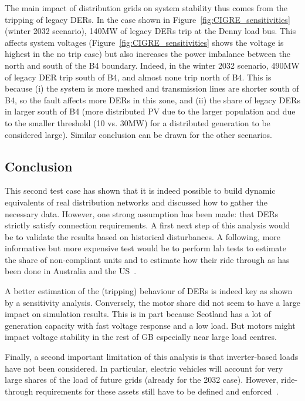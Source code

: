 The main impact of distribution grids on system stability thus comes from the tripping of legacy DERs. In the case shown in Figure~\ref{fig:CIGRE_sensitivities} (winter 2032 scenario), 140MW of legacy DERs trip at the Denny load bus. This affects system voltages (Figure~\ref{fig:CIGRE_sensitivities} shows the voltage is highest in the no trip case) but also increases the power imbalance between the north and south of the B4 boundary. Indeed, in the winter 2032 scenario, 490MW of legacy DER trip south of B4, and almost none trip north of B4. This is because (i) the system is more meshed and transmission lines are shorter south of B4, so the fault affects more DERs in this zone, and (ii) the share of legacy DERs in larger south of B4 (more distributed PV due to the larger population and due to the smaller threshold (10 vs. 30MW) for a distributed generation to be considered large). Similar conclusion can be drawn for the other scenarios.


\subsection{Conclusion}
\label{sec:CIGRE_conclusion}

This second test case has shown that it is indeed possible to build dynamic equivalents of real distribution networks and discussed how to gather the necessary data. However, one strong assumption has been made: that DERs strictly satisfy connection requirements. A first next step of this analysis would be to validate the results based on historical disturbances. A following, more informative but more expensive test would be to perform lab tests to estimate the share of non-compliant units and to estimate how their ride through as has been done in Australia and the US~\cite{aemo_psse_2022, pourbeik_developing_2021}.

A better estimation of the (tripping) behaviour of DERs is indeed key as shown by a sensitivity analysis. Conversely, the motor share did not seem to have a large impact on simulation results. This is in part because Scotland has a lot of generation capacity with fast voltage response and a low load. But motors might impact voltage stability in the rest of GB especially near large load centres.

Finally, a second important limitation of this analysis is that inverter-based loads have not been considered. In particular, electric vehicles will account for very large shares of the load of future grids (already for the 2032 case). However, ride-through requirements for these assets still have to be defined and enforced~\cite{sygensys}.


